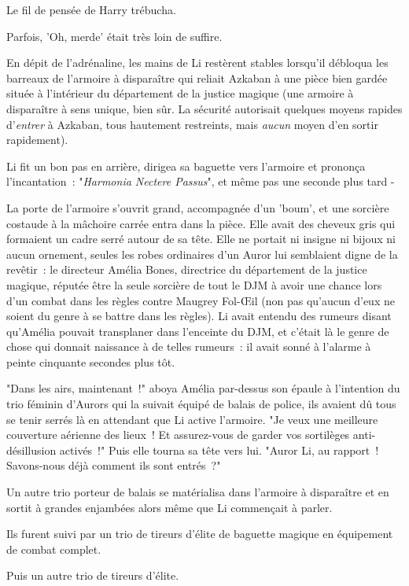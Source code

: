Le fil de pensée de Harry trébucha.

Parfois, 'Oh, merde' était très loin de suffire.

\later

En dépit de l'adrénaline, les mains de Li restèrent stables lorsqu'il débloqua les barreaux de l'armoire à disparaître qui reliait Azkaban à une pièce bien gardée située à l'intérieur du département de la justice magique (une armoire à disparaître à sens unique, bien sûr. La sécurité autorisait quelques moyens rapides d'\emph{entrer} à Azkaban, tous hautement restreints, mais \emph{aucun} moyen d'en sortir rapidement).

Li fit un bon pas en arrière, dirigea sa baguette vers l'armoire et prononça l'incantation~: "\emph{Harmonia Nectere Passus}", et même pas une seconde plus tard -

La porte de l'armoire s'ouvrit grand, accompagnée d'un 'boum', et une sorcière costaude à la mâchoire carrée entra dans la pièce. Elle avait des cheveux gris qui formaient un cadre serré autour de sa tête. Elle ne portait ni insigne ni bijoux ni aucun ornement, seules les robes ordinaires d'un Auror lui semblaient digne de la revêtir~: le directeur Amélia Bones, directrice du département de la justice magique, réputée être la seule sorcière de tout le DJM à avoir une chance lors d'un combat dans les règles contre Maugrey Fol-Œil (non pas qu'aucun d'eux ne soient du genre à se battre dans les règles). Li avait entendu des rumeurs disant qu'Amélia pouvait transplaner dans l'enceinte du DJM, et c'était là le genre de chose qui donnait naissance à de telles rumeurs~: il avait sonné à l'alarme à peinte cinquante secondes plus tôt.

"Dans les airs, maintenant~!" aboya Amélia par-dessus son épaule à l'intention du trio féminin d'Aurors qui la suivait équipé de balais de police, ils avaient dû tous se tenir serrés là en attendant que Li active l'armoire. "Je veux une meilleure couverture aérienne des lieux~! Et assurez-vous de garder vos sortilèges anti-désillusion activés~!" Puis elle tourna sa tête vers lui. "Auror Li, au rapport~! Savons-nous déjà comment ils sont entrés~?"

Un autre trio porteur de balais se matérialisa dans l'armoire à disparaître et en sortit à grandes enjambées alors même que Li commençait à parler.

Ils furent suivi par un trio de tireurs d'élite de baguette magique en équipement de combat complet.

Puis un autre trio de tireurs d'élite.

